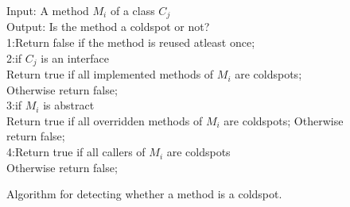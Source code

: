 \begin{figure}[t]
\begin{CodeOut}
Input: A method $M_i$ of a class $C_j$\\
Output: Is the method a coldspot or not?\\
1:Return false if the method is reused atleast once;\\
2:if $C_j$ is an interface \\
\hspace*{0.3in}Return true if all implemented methods of $M_i$ are coldspots; 
\hspace*{0.3in}Otherwise return false; \\
3:if $M_i$ is abstract \\
\hspace*{0.3in}Return true if all overridden methods of $M_i$ are coldspots;
\hspace*{0.3in}Otherwise return false; \\
4:Return true if all callers of $M_i$ are coldspots \\
\hspace*{0.3in}Otherwise return false; \\
\end{CodeOut}
\caption{\label{alg:coldspotalg}Algorithm for detecting whether a method is a coldspot.} 
\end{figure}

